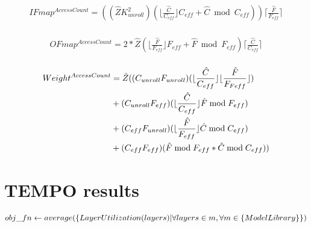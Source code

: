 \begin{equation}
    \begin{aligned}
        IFmap^{AccessCount} = ((\hat{Z} K_{unroll}^2) (\lfloor\frac{\hat{C}}{C_{eff}} \rfloor C_{eff} + \hat{C}\bmod C_{eff}))\lceil\frac{\hat{F}}{F_{eff}}\rceil \\
    \end{aligned}
    \label{math:memory_access_ifmap}
\end{equation}
  
\begin{equation}
    \begin{aligned}
        OFmap^{AccessCount} = 2*\hat{Z} (\lfloor\frac{\hat{F}}{F_{eff}}\rfloor F_{eff}+\hat{F}\bmod F_{eff}) \lceil\frac{\hat{C}}{C_{eff}}\rceil \\
    \end{aligned}
    \label{math:memory_access_OFmap}
\end{equation}

\begin{equation}
    \begin{aligned}
        Weight^{AccessCount} & = \hat{Z}((C_{unroll}F_{unroll})(\lfloor\frac{\hat{C}}{C_{eff}} \rfloor \lfloor\frac{\hat{F}}{F_{Feff}}\rfloor) \\
            & +(C_{unroll}F_{eff})(\lfloor\frac{\hat{C}}{C_{eff}} \rfloor \hat{F}\bmod F_{eff}) \\
            & +(C_{eff}F_{unroll})(\lfloor\frac{\hat{F}}{F_{eff}} \rfloor \hat{C}\bmod C_{eff}) \\
            & + (C_{eff}F_{eff})(\hat{F}\bmod F_{eff}\space* \hat{C}\bmod C_{eff}))
        \end{aligned}
    \label{math:memory_access_weights}
\end{equation}

\section{TEMPO results}
\label{chap:dataflow_dse:exploring:results}

\begin{equation}
    obj\_fn \gets average (\{LayerUtilization(layers)\space|\space \forall layers \in m, \forall m \in \{ModelLibrary\}\})
\label{math:tempo_results_obj_fn}
\end{equation}

